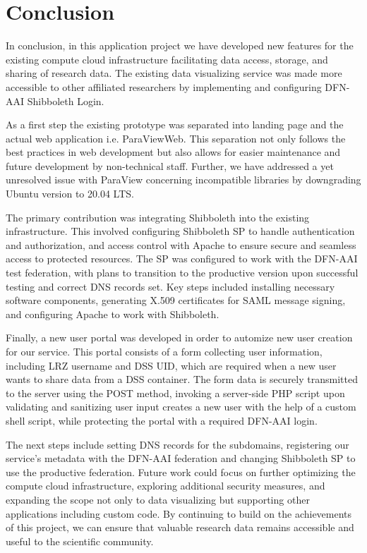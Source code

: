 \chapter{Conclusion}\label{chapter:conclusion}

In conclusion, in this application project we have developed new features for
the existing compute cloud infrastructure facilitating data access, storage, and
sharing of research data. The existing data visualizing service was made more
accessible to other affiliated researchers by implementing and configuring
DFN-AAI Shibboleth Login.

As a first step the existing prototype was separated into landing page and the
actual web application i.e. ParaViewWeb. This separation not only follows the
best practices in web development but also allows for easier maintenance and
future development by non-technical staff. Further, we have addressed a yet
unresolved issue with ParaView concerning incompatible libraries by downgrading
Ubuntu version to 20.04 LTS.

The primary contribution was integrating Shibboleth into the existing
infrastructure. This involved configuring Shibboleth SP to handle authentication
and authorization, and access control with Apache to ensure secure and seamless
access to protected resources. The SP was configured to work with the DFN-AAI
test federation, with plans to transition to the productive version upon
successful testing and correct DNS records set. Key steps included installing
necessary software components, generating X.509 certificates for SAML message
signing, and configuring Apache to work with Shibboleth.

Finally, a new user portal was developed in order to automize new user creation
for our service. This portal consists of a form collecting user information,
including LRZ username and DSS UID, which are required when a new user wants to
share data from a DSS container. The form data is securely transmitted to the
server using the POST method, invoking a server-side PHP script upon validating
and sanitizing user input creates a new user with the help of a custom shell
script, while protecting the portal with a required DFN-AAI login.

The next steps include setting DNS records for the subdomains, registering our
service's metadata with the DFN-AAI federation and changing Shibboleth SP to use
the productive federation. Future work could focus on further optimizing the
compute cloud infrastructure, exploring additional security measures, and
expanding the scope not only to data visualizing but supporting other
applications including custom code. By continuing to build on the achievements
of this project, we can ensure that valuable research data remains accessible
and useful to the scientific community.
